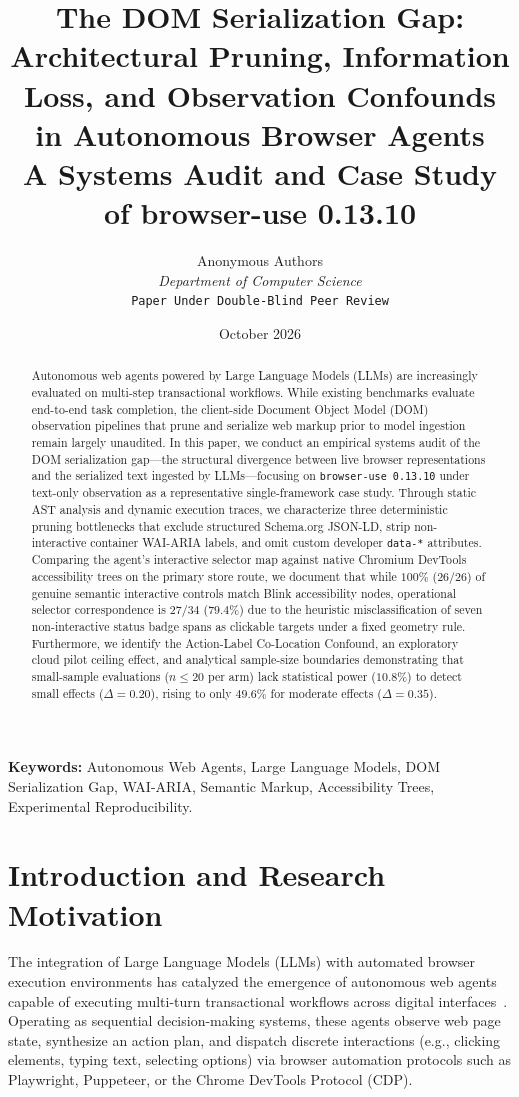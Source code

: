 \documentclass[11pt,a4paper]{article}
\title{\textbf{The DOM Serialization Gap: Architectural Pruning, Information Loss, and Observation Confounds in Autonomous Browser Agents} \\[6pt]
{\large A Systems Audit and Case Study of browser-use 0.13.10}}
\author{
  Anonymous Authors \\
  \textit{Department of Computer Science} \\
  \texttt{Paper Under Double-Blind Peer Review}
}
\date{October 2026}
\begin{document}
\maketitle

\begin{abstract}
Autonomous web agents powered by Large Language Models (LLMs) are increasingly evaluated on multi-step transactional workflows. While existing benchmarks evaluate end-to-end task completion, the client-side Document Object Model (DOM) observation pipelines that prune and serialize web markup prior to model ingestion remain largely unaudited. In this paper, we conduct an empirical systems audit of the DOM serialization gap---the structural divergence between live browser representations and the serialized text ingested by LLMs---focusing on \texttt{browser-use 0.13.10} under text-only observation as a representative single-framework case study. Through static AST analysis and dynamic execution traces, we characterize three deterministic pruning bottlenecks that exclude structured Schema.org JSON-LD, strip non-interactive container WAI-ARIA labels, and omit custom developer \texttt{data-*} attributes. Comparing the agent's interactive selector map against native Chromium DevTools accessibility trees on the primary store route, we document that while $100\%$ ($26/26$) of genuine semantic interactive controls match Blink accessibility nodes, operational selector correspondence is $27/34$ ($79.4\%$) due to the heuristic misclassification of seven non-interactive status badge spans as clickable targets under a fixed geometry rule. Furthermore, we identify the Action-Label Co-Location Confound, an exploratory cloud pilot ceiling effect, and analytical sample-size boundaries demonstrating that small-sample evaluations ($n \le 20$ per arm) lack statistical power ($10.8\%$) to detect small effects ($\Delta = 0.20$), rising to only $49.6\%$ for moderate effects ($\Delta = 0.35$).
\end{abstract}

\textbf{Keywords:} Autonomous Web Agents, Large Language Models, DOM Serialization Gap, WAI-ARIA, Semantic Markup, Accessibility Trees, Experimental Reproducibility.

\section{Introduction and Research Motivation}
\label{sec:intro}

The integration of Large Language Models (LLMs) with automated browser execution environments has catalyzed the emergence of autonomous web agents capable of executing multi-turn transactional workflows across digital interfaces~\cite{zhou2024webarena, deng2023mind2web, drouin2024workarena, workarenapp2024, osworld2024}. Operating as sequential decision-making systems, these agents observe web page state, synthesize an action plan, and dispatch discrete interactions (e.g., clicking elements, typing text, selecting options) via browser automation protocols such as Playwright, Puppeteer, or the Chrome DevTools Protocol (CDP).
\end{document}
